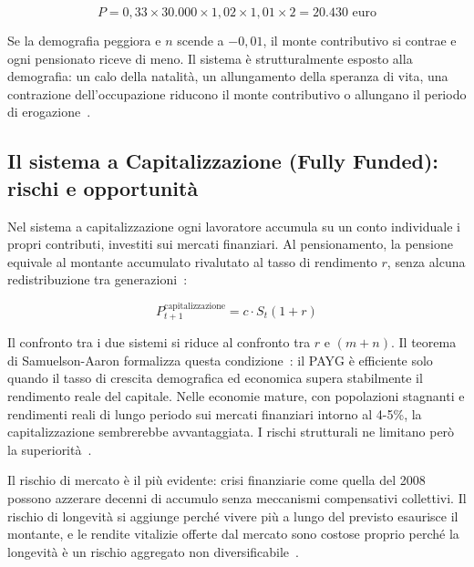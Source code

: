 \[
P = 0{,}33 \times 30.000 \times 1{,}02 \times 1{,}01 \times 2 = 20.430 \text{ euro}
\]

Se la demografia peggiora e \(n\) scende a \(-0{,}01\), il monte contributivo si contrae e ogni pensionato riceve di meno. Il sistema è strutturalmente esposto alla demografia: un calo della natalità, un allungamento della speranza di vita, una contrazione dell'occupazione riducono il monte contributivo o allungano il periodo di erogazione~\cite{RosenGayerRapallini2023}.

\subsection{Il sistema a Capitalizzazione (Fully Funded): rischi e opportunità}

Nel sistema a capitalizzazione ogni lavoratore accumula su un conto individuale i propri contributi, investiti sui mercati finanziari. Al pensionamento, la pensione equivale al montante accumulato rivalutato al tasso di rendimento \(r\), senza alcuna redistribuzione tra generazioni~\cite{Bosi2018, RosenGayerRapallini2023}:

\[
P_{t+1}^{\text{capitalizzazione}} = c \cdot S_t (1+r)
\]

Il confronto tra i due sistemi si riduce al confronto tra \(r\) e \((m+n)\). Il teorema di Samuelson-Aaron formalizza questa condizione~\cite{Samuelson1958, Aaron1966}: il PAYG è efficiente solo quando il tasso di crescita demografica ed economica supera stabilmente il rendimento reale del capitale. Nelle economie mature, con popolazioni stagnanti e rendimenti reali di lungo periodo sui mercati finanziari intorno al 4-5\%, la capitalizzazione sembrerebbe avvantaggiata. I rischi strutturali ne limitano però la superiorità~\cite{Bosi2018}.

Il rischio di mercato è il più evidente: crisi finanziarie come quella del 2008 possono azzerare decenni di accumulo senza meccanismi compensativi collettivi. Il rischio di longevità si aggiunge perché vivere più a lungo del previsto esaurisce il montante, e le rendite vitalizie offerte dal mercato sono costose proprio perché la longevità è un rischio aggregato non diversificabile~\cite{RosenGayerRapallini2023}.

